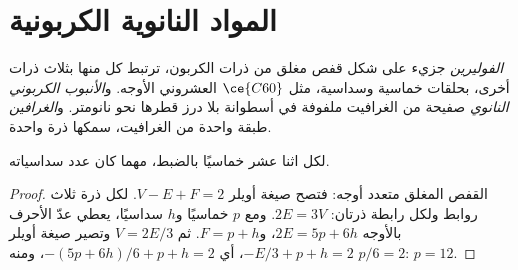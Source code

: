 \section{المواد النانوية الكربونية}

\begin{definition}\label{def:b3:inorganic-materials:carbon}
\emph{الفوليرين} جزيء على شكل قفص مغلق من ذرات الكربون،
ترتبط كل منها بثلاث ذرات أخرى، بحلقات خماسية وسداسية، مثل
$\ce{C60}$ العشروني الأوجه. و\emph{الأنبوب الكربوني النانوي} صفيحة من
الغرافيت ملفوفة في أسطوانة بلا درز قطرها نحو نانومتر.
و\emph{الغرافين} طبقة واحدة من الغرافيت، سمكها ذرة واحدة.
\end{definition}

\begin{proposition}\label{prop:b3:inorganic-materials:euler}
لكل  اثنا عشر خماسيًا بالضبط، مهما كان عدد
سداسياته.
\end{proposition}

\begin{proof}
القفص المغلق متعدد أوجه: فتصح صيغة أويلر $V - E + F = 2$. لكل ذرة
ثلاث روابط ولكل رابطة ذرتان: $2E = 3V$. ومع $p$ خماسيًا و$h$ سداسيًا،
يعطي عدّ الأحرف بالأوجه $2E = 5p + 6h$، و$F = p + h$. ثم $V = 2E/3$ وتصير صيغة
أويلر $-E/3 + p + h = 2$، أي $-(5p + 6h)/6 + p + h = 2$، ومنه $p/6 = 2$: $p = 12$.
\end{proof}

